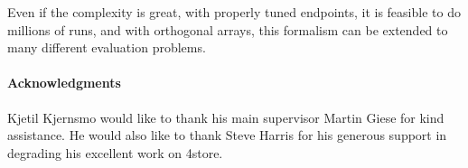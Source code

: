 \documentclass{llncs}
\begin{document}
Even if the complexity is great, with properly tuned endpoints, it is
feasible to do millions of runs, and with orthogonal arrays, this
formalism can be extended to many different evaluation problems.



\paragraph*{Acknowledgments}

Kjetil Kjernsmo would like to thank his main supervisor Martin Giese
for kind assistance. He would also like to thank Steve Harris for his
generous support in degrading his excellent work on 4store.


%
%
%
%
%

\end{document}
